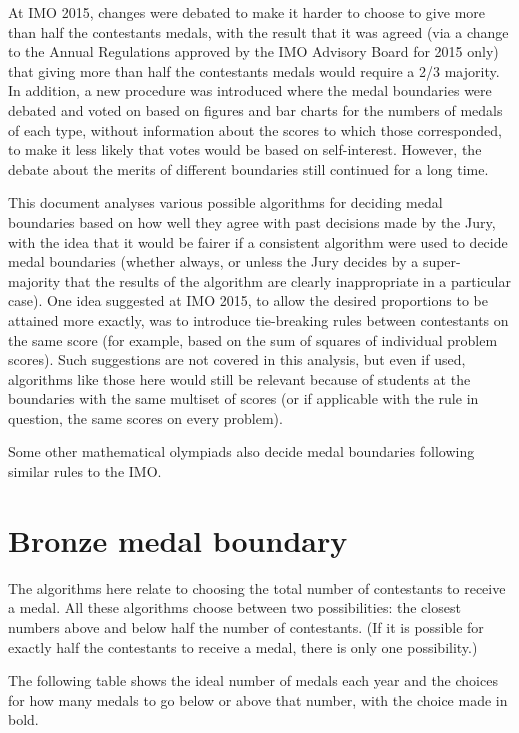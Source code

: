 \documentclass[a4paper,11pt]{article}
\begin{document}
At IMO 2015, changes were debated to make it harder to choose to give
more than half the contestants medals, with the result that it was
agreed (via a change to the Annual Regulations approved by the IMO
Advisory Board for 2015 only) that giving more than half the
contestants medals would require a 2/3 majority.  In addition, a new
procedure was introduced where the medal boundaries were debated and
voted on based on figures and bar charts for the numbers of medals of
each type, without information about the scores to which those
corresponded, to make it less likely that votes would be based on
self-interest.  However, the debate about the merits of different
boundaries still continued for a long time.

This document analyses various possible algorithms for deciding medal
boundaries based on how well they agree with past decisions made by
the Jury, with the idea that it would be fairer if a consistent
algorithm were used to decide medal boundaries (whether always, or
unless the Jury decides by a super-majority that the results of the
algorithm are clearly inappropriate in a particular case).  One idea
suggested at IMO 2015, to allow the desired proportions to be attained
more exactly, was to introduce tie-breaking rules between contestants
on the same score (for example, based on the sum of squares of
individual problem scores).  Such suggestions are not covered in this
analysis, but even if used, algorithms like those here would still be
relevant because of students at the boundaries with the same multiset
of scores (or if applicable with the rule in question, the same scores
on every problem).

Some other mathematical olympiads also decide medal boundaries
following similar rules to the IMO.

\section*{Bronze medal boundary}

The algorithms here relate to choosing the total number of contestants
to receive a medal.  All these algorithms choose between two
possibilities: the closest numbers above and below half the number of
contestants.  (If it is possible for exactly half the contestants to
receive a medal, there is only one possibility.)

The following table shows the ideal number of medals each year and the
choices for how many medals to go below or above that number, with the
choice made in bold.
\end{document}
